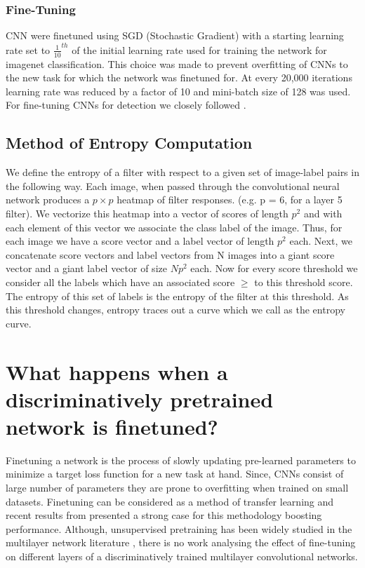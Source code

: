 \documentclass[runningheads]{llncs}
\begin{document}
\subsubsection{Fine-Tuning}
\label{sub:fine-train}
CNN were finetuned using SGD (Stochastic Gradient) with a starting learning rate set to $\frac{1}{10}^{th}$ of the initial learning rate used for training the network for imagenet classification. This choice was made to prevent overfitting of CNNs to the new task for which the network was finetuned for. At every 20,000 iterations learning rate was reduced by a factor of 10 and mini-batch size of 128 was used. For fine-tuning CNNs for detection we closely followed \cite{Rcnn}. 

\subsection{Method of Entropy Computation}
\label{sub:def-ent}
We define the entropy of a filter with respect to a given set of image-label pairs in the following way. Each image, when passed through the convolutional neural network produces a $p \times p$ heatmap of filter responses. (e.g. p = 6, for a layer 5 filter). We vectorize this heatmap into a vector of scores of length $p^2$ and with each element of this vector we associate the class label of the image. Thus, for each image we have a score vector and a label vector of length $p^2$ each. Next, we concatenate score vectors and label vectors from N images into a giant score vector and a giant label vector  of size $Np^2$ each. Now for every score threshold we consider all the labels which have an associated score $\geq$ to this threshold score. The entropy of this set of labels is the entropy of the filter at this threshold. As this threshold changes, entropy traces out a curve which we call as the entropy curve.  


\section{What happens when a discriminatively pretrained network is finetuned?}
\label{sec:fine}
Finetuning a network is the process of slowly updating pre-learned parameters to minimize a target loss function for a new task at hand. Since, CNNs consist of large number of parameters they are prone to overfitting when trained on small datasets. Finetuning can be considered as a method of transfer learning and recent results from \cite{Rcnn, Decaf} presented a strong case for this methodology boosting performance. Although, unsupervised pretraining has been widely studied in the multilayer network literature \cite{AmitGeman, DeepPre}, there is no work analysing the effect of fine-tuning on different layers of a discriminatively trained multilayer convolutional networks.
\end{document}
